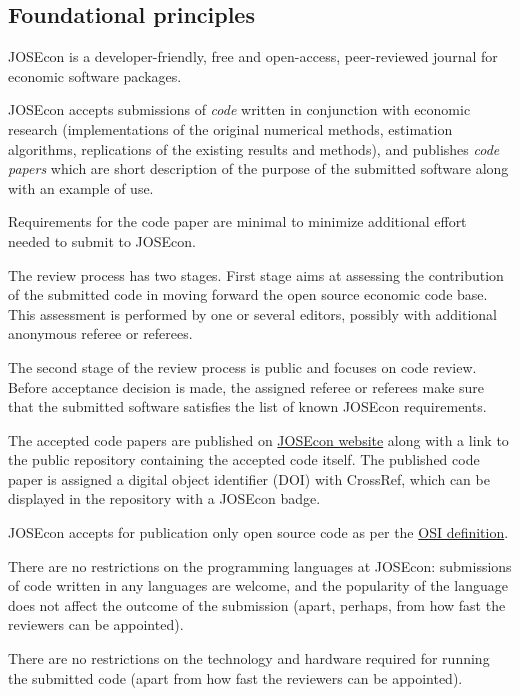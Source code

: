 
\subsection{Foundational principles}

JOSEcon is a developer-friendly, free and open-access, peer-reviewed journal for 
economic software packages.

JOSEcon accepts submissions of \emph{code} written in conjunction with economic
research (implementations of the original numerical methods, estimation algorithms, 
replications of the existing results and methods),
and publishes \emph{code papers} which are short description of the purpose of the submitted 
software along with an example of use.

Requirements for the code paper are minimal to minimize additional effort needed to
submit to JOSEcon.

The review process has two stages. First stage aims at assessing the contribution
of the submitted code in moving forward the open source economic code base.
This assessment is performed by one or several editors, possibly with additional 
anonymous referee or referees.

The second stage of the review process is public and focuses on code review. 
Before acceptance decision is made, the assigned referee or referees make sure that 
the submitted software satisfies the list of known JOSEcon requirements.

The accepted code papers are published on \href{http://josecon.org}{JOSEcon website}
along with a link to the public repository containing the accepted code itself.
The published code paper is assigned a digital object identifier (DOI) with CrossRef, 
which can be displayed in the repository with a JOSEcon badge.

JOSEcon accepts for publication only open source code as per 
the \href{https://opensource.org/osd}{OSI definition}.

There are no restrictions on the programming languages at JOSEcon: submissions of code 
written in any languages are welcome, and the popularity of the language does not 
affect the outcome of the submission (apart, perhaps, from how fast the reviewers can be
appointed).

There are no restrictions on the technology and hardware required for running
the submitted code (apart from how fast the reviewers can be appointed).

